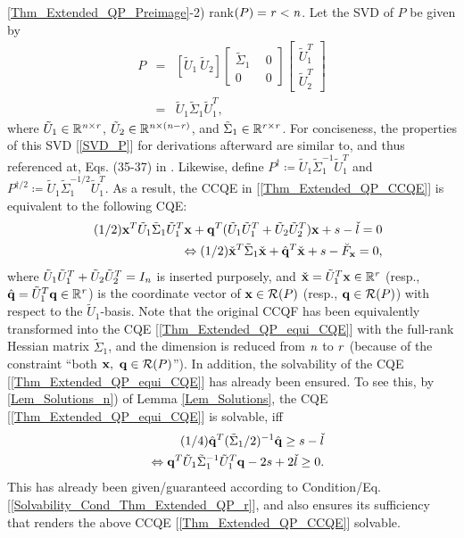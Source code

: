 \documentclass[9pt,twocolumn,twoside,lineno]{pnas-new-1}
\newcommand{\beq}{\begin{eqnarray}}
\newcommand{\eeq}{\end{eqnarray}}
\newcommand{\bfx}{{\bf x}}
\newcommand{\bfq}{{\bf q}}
\newcommand{\real}{\mathbb{R}}
\newcommand{\calR}{{\mathcal R}}
\newcommand{\itn}{{\it n}}
\newcommand{\itr}{{\it r}}
\theoremstyle{remark}
\begin{document}
\noindent\ref{Thm_Extended_QP_Preimage}-2) rank$(P)=\itr<\itn$. Let the SVD of $P$ be given by
\beq
P&=&[\tilde U_1~\tilde U_2]\left[ \begin{array}{cc} \tilde\Sigma_1~~ & 0\\ 0~~ & 0\end{array}\right]\left[ \begin{array}{c} \tilde U_1^T\\\tilde U_2^T\end{array}\right]\nonumber\\
&=&\tilde U_1\tilde\Sigma_1\tilde U_1^T,\label{SVD_P}
\eeq
where $\tilde U_1\in\real^{{\it n}\times {\it r}}$, $\tilde U_2\in\real^{{\it n}\times ({\it n-r})}$, and $\tilde\Sigma_1\in\real^{{\it r}\times {\it r}}$. For conciseness, the properties of this SVD [\ref{SVD_P}] for derivations afterward are similar to, and thus referenced at, Eqs. (35-37) in \cite{LiLiHs:20}. Likewise, define $P^\dagger\coloneqq\tilde U_1\tilde\Sigma_1^{-1}\tilde U_1^T$ and $P^{\dagger/2}\coloneqq\tilde U_1\tilde\Sigma_1^{-1/2}\tilde U_1^T$. As a result, the CCQE in [\ref{Thm_Extended_QP_CCQE}] is equivalent to the following CQE:
\beq
&&(1/2)\bfx^T\tilde U_1\tilde\Sigma_1\tilde U_1^T\bfx+\bfq^T(\tilde U_1\tilde U_1^T+\tilde U_2\tilde U_2^T)\bfx+s-\check l=0\nonumber\\
&&\Leftrightarrow (1/2)\check\bfx^T\tilde\Sigma_1\check\bfx+\hat\bfq^T\check\bfx+s-\breve F_{\bfx}=0,
\label{Thm_Extended_QP_equi_CQE}
\eeq
where $\tilde U_1\tilde U_1^T+\tilde U_2\tilde U_2^T=I_\itn$ is inserted purposely, and $\check\bfx=\tilde U_1^T\bfx\in\real^\itr$ (resp., $\hat\bfq=\tilde U_1^T\bfq\in\real^\itr$) is the coordinate vector of $\bfx\in \calR(P)$ (resp., $\bfq\in \calR(P)$) with respect to the $\tilde U_1$-basis. Note that the original CCQF has been equivalently transformed into the CQE [\ref{Thm_Extended_QP_equi_CQE}] with the full-rank Hessian matrix $\tilde\Sigma_1$, and the dimension is reduced from $\itn$ to $\itr$ (because of the constraint ``both $\bfx,~\bfq\in\calR(P)$''). In addition, the solvability of the CQE [\ref{Thm_Extended_QP_equi_CQE}] has already been ensured. To see this, by \ref{Lem_Solutions_n}) of Lemma \ref{Lem_Solutions}, the CQE [\ref{Thm_Extended_QP_equi_CQE}] is solvable, iff
\beq
&&(1/4)\hat\bfq^T(\tilde\Sigma_1/2)^{-1}\hat\bfq\ge s-\check l\nonumber\\
&&\Leftrightarrow \bfq^T\tilde U_1\tilde\Sigma_1^{-1}\tilde U_1^T\bfq-2s+2\check l\ge 0.\nonumber
\eeq
This has already been given/guaranteed according to Condition/Eq. [\ref{Solvability_Cond_Thm_Extended_QP_r}], and also ensures its sufficiency that renders the above CCQE [\ref{Thm_Extended_QP_CCQE}] solvable.
\end{document}
